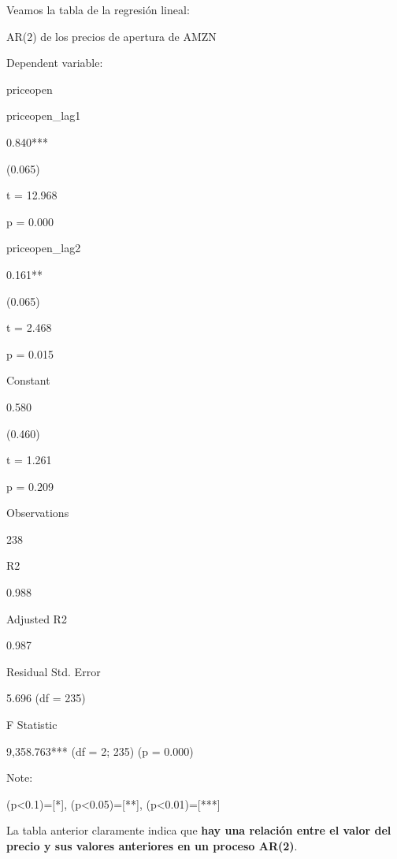 \documentclass[
]{book}
\newenvironment{Shaded}{\begin{snugshade}}{\end{snugshade}}
\newcommand{\AttributeTok}[1]{\textcolor[rgb]{0.77,0.63,0.00}{#1}}
\newcommand{\DecValTok}[1]{\textcolor[rgb]{0.00,0.00,0.81}{#1}}
\newcommand{\FunctionTok}[1]{\textcolor[rgb]{0.00,0.00,0.00}{#1}}
\newcommand{\NormalTok}[1]{#1}
\newcommand{\OtherTok}[1]{\textcolor[rgb]{0.56,0.35,0.01}{#1}}
\newcommand{\SpecialCharTok}[1]{\textcolor[rgb]{0.00,0.00,0.00}{#1}}
\begin{document}
\begin{Shaded}
\end{Shaded}

Veamos la tabla de la regresión lineal:

AR(2) de los precios de apertura de AMZN

Dependent variable:

priceopen

priceopen\_lag1

0.840***

(0.065)

t = 12.968

p = 0.000

priceopen\_lag2

0.161**

(0.065)

t = 2.468

p = 0.015

Constant

0.580

(0.460)

t = 1.261

p = 0.209

Observations

238

R2

0.988

Adjusted R2

0.987

Residual Std. Error

5.696 (df = 235)

F Statistic

9,358.763*** (df = 2; 235) (p = 0.000)

Note:

(p\textless0.1)={[}*{]}, (p\textless0.05)={[}**{]}, (p\textless0.01)={[}***{]}

La tabla anterior claramente indica que \textbf{hay una relación entre el valor del precio y sus valores anteriores en un proceso AR(2)}.

  
\end{document}
